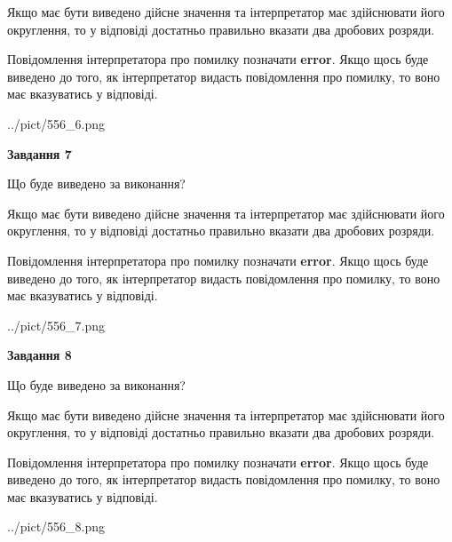 \documentclass[12pt, ukrainian]{article}
\begin{document}
{\begin {Large}
Якщо має бути виведено дійсне значення та інтерпретатор має здійснювати його округлення, 
то у відповіді достатньо правильно вказати два дробових розряди.

Повідомлення інтерпретатора про помилку позначати \textbf{error}.
Якщо щось буде виведено до того, як інтерпретатор видасть повідомлення про помилку, 
то воно має вказуватись у відповіді. \par

\begin{center}
	{../pict/556_6.png}
\end{center}
\newpage

{\begin {center}\textbf{Завдання 7}\end {center}}\par
Що буде виведено за виконання? \par

Якщо має бути виведено дійсне значення та інтерпретатор має здійснювати його округлення, 
то у відповіді достатньо правильно вказати два дробових розряди.

Повідомлення інтерпретатора про помилку позначати \textbf{error}.
Якщо щось буде виведено до того, як інтерпретатор видасть повідомлення про помилку, 
то воно має вказуватись у відповіді. \par

\begin{center}
	{../pict/556_7.png}
\end{center}
\newpage

{\begin {center}\textbf{Завдання 8}\end {center}}\par
Що буде виведено за виконання? \par

Якщо має бути виведено дійсне значення та інтерпретатор має здійснювати його округлення, 
то у відповіді достатньо правильно вказати два дробових розряди.

Повідомлення інтерпретатора про помилку позначати \textbf{error}.
Якщо щось буде виведено до того, як інтерпретатор видасть повідомлення про помилку, 
то воно має вказуватись у відповіді. \par

\begin{center}
	{../pict/556_8.png}
\end{center}
\newpage


\end{Large}}
\end{document}
